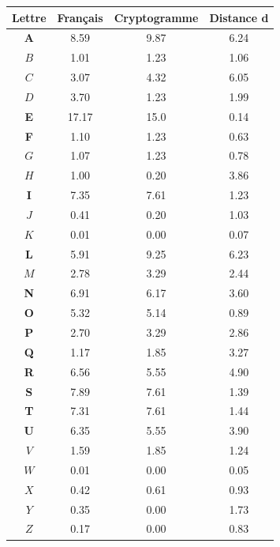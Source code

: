\documentclass[a4paper, titlepage]{livret}
\begin{document}
\begin{center}
\begin{tabular}{|c|c|c|c|}
\hline
\textbf{Lettre} & \textbf{Français} & \textbf{Cryptogramme} & \textbf{Distance d}\\
\hline
  \textbf{A} & 8.59 &  9.87  &  6.24\\
\hline
  $B$ & 1.01 &     1.23 &  1.06\\
\hline
  $C$ & 3.07 &     4.32 &  6.05\\
\hline
  $D$ & 3.70 &     1.23 &  1.99\\
\hline
    \textbf{E}  & 17.17 &    15.0 &  0.14 \\
\hline
    \textbf{F}  & 1.10 &     1.23 &  0.63\\
\hline
  $G$ & 1.07 &     1.23 &  0.78\\
\hline
  $H$ & 1.00 &     0.20 &  3.86\\
\hline
    \textbf{I}  & 7.35 &     7.61 &  1.23\\
\hline
  $J$ & 0.41 &     0.20 &  1.03\\
\hline
  $K$ & 0.01 &     0.00 &  0.07\\
\hline
    \textbf{L}  & 5.91 &     9.25 &  6.23\\
\hline
  $M$ & 2.78 &     3.29 &  2.44\\
\hline
    \textbf{N}  & 6.91 &     6.17 &  3.60\\
\hline
  \textbf{O} & 5.32 &     5.14 &  0.89\\
\hline
  \textbf{P} & 2.70 &     3.29 &  2.86\\
\hline
    \textbf{Q}  & 1.17 &     1.85 &  3.27\\
\hline
    \textbf{R}  & 6.56 &     5.55 &  4.90\\
\hline
    \textbf{S}  & 7.89 &     7.61 &  1.39\\
\hline
    \textbf{T}  & 7.31 &     7.61 &  1.44\\
\hline
    \textbf{U}  & 6.35 &     5.55 &  3.90\\
\hline
   $V$ & 1.59 &     1.85 &  1.24\\
\hline
   $W$ & 0.01 &     0.00 &  0.05\\
\hline
   $X$ & 0.42 &     0.61 &  0.93\\
\hline
   $Y$ & 0.35 &     0.00 &  1.73\\
\hline
   $Z$ & 0.17 &     0.00 &  0.83\\
\hline
  \end{tabular}
  \label{tab232}
\end{center}
\end{document}
